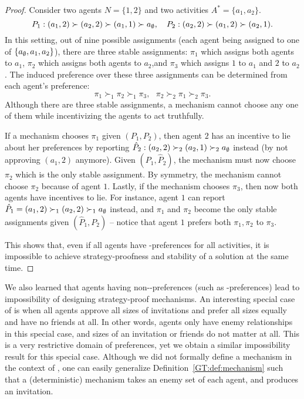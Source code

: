 \begin{proof} 
Consider two agents $N = \{1, 2\}$ and two activities $A^* = \{a_1, a_2\}$.
	\begin{equation*}
		P_1: (a_1, 2) \succ (a_2, 2) \succ (a_1, 1) \succ a_{\emptyset}, ~~~
		P_2: (a_2, 2) \succ (a_1, 2) \succ (a_2, 1).
	\end{equation*}
In this setting, out of nine possible assignments (each agent being assigned to one of $\{a_{\emptyset}, a_1, a_2\}$), there are three stable assignments: $\pi_1$ which assigns both agents to $a_1$, $\pi_2$ which assigns both agents to $a_2$,and $\pi_3$ which assigns $1$ to $a_1$ and $2$ to $a_2$.
The induced preference over these three assignments can be determined from each agent's preference: 
	\begin{equation*}
		\pi_1 \succ_1 \pi_2 \succ_1 \pi_3, ~~~
		\pi_2 \succ_2 \pi_1 \succ_2 \pi_3.
	\end{equation*} 
Although there are three stable assignments, a mechanism cannot choose any one of them while incentivizing the agents to act truthfully.

If a mechanism chooses $\pi_1$ given $(P_1, P_2)$, then agent $2$ has an incentive to lie about her preferences by reporting $\hat{P}_2: (a_2, 2) \succ_2 (a_2, 1) \succ_2 a_{\emptyset}$ instead (by not approving $(a_1, 2)$ anymore). Given $(P_1, \hat{P}_2)$, the mechanism must now choose $\pi_2$ which is the only stable assignment. 
By symmetry, the mechanism cannot choose $\pi_2$ because of agent $1$.
Lastly, if the mechanism chooses $\pi_3$, then now both agents have incentives to lie. For instance, agent $1$ can report $\hat{P}_1 = (a_1, 2) \succ_1 (a_2, 2) \succ_1 a_{\emptyset}$ instead, and $\pi_1$ and $\pi_2$ become the only stable assignments given $(\hat{P}_1, P_2)$ -- notice that agent $1$ prefers both $\pi_1, \pi_2$ to $\pi_3$. 

This shows that, even if all agents have \INC-preferences for all activities, it is impossible to achieve strategy-proofness and stability of a solution at the same time.
\end{proof}


We also learned that agents having non-\INC-preferences (such as \DEC-preferences) lead to impossibility of designing strategy-proof mechanisms. An interesting special case of \SIPs is when all agents approve all sizes of invitations and prefer all sizes equally and have no friends at all. In other words, agents only have enemy relationships in this special case, and sizes of an invitation or friends do not matter at all. This is a very restrictive domain of preferences, yet we obtain a similar impossibility result for this special case. Although we did not formally define a mechanism in the context of \SIP, one can easily generalize Definition~\ref{GT:def:mechanism} such that a (deterministic) mechanism takes an enemy set of each agent, and produces an invitation.


